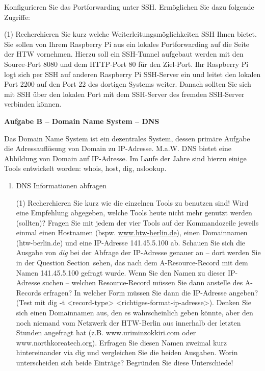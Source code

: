 \documentclass[paper=a4,fontsize=11pt]{scrartcl}%
\numberwithin{equation}{section}
\begin{document}
{\begin{enumerate}
	Konfigurieren Sie das Portforwarding unter SSH. Ermöglichen Sie dazu folgende Zugriffe:
	\begin{tasks}(1)
		\task Recherchieren Sie kurz welche Weiterleitungsmöglichkeiten SSH Ihnen bietet.
		\task Sie sollen von Ihrem Raspberry Pi aus ein lokales Portforwarding auf die Seite der HTW vornehmen. Hierzu soll ein SSH-Tunnel aufgebaut werden mit den Source-Port 8080 und dem HTTP-Port 80 für den Ziel-Port.
		\task Ihr Raspberry Pi logt sich per SSH auf anderen Raspberry Pi SSH-Server ein und leitet den lokalen Port 2200 auf den Port 22 des dortigen Systems weiter. Danach sollten Sie sich mit SSH über den lokalen Port mit dem SSH-Server des fremden SSH-Server verbinden können.
	\end{tasks}
\end{enumerate}
\begin{center}\Large{\textbf{Aufgabe B -- Domain Name System -- DNS}}\end{center}\vskip0.25in
Das Domain Name System ist ein dezentrales System, dessen primäre Aufgabe die Adressauflösung von Domain zu IP-Adresse. M.a.W. DNS bietet eine Abbildung von Domain auf IP-Adresse. Im Laufe der Jahre sind hierzu einige Tools entwickelt worden: whois, host, dig, nslookup.
\begin{enumerate}
	\item DNS Informationen abfragen
	\begin{tasks}(1)
		\task Recherchieren Sie kurz wie die einzelnen Tools zu benutzen sind! Wird eine Empfehlung abgegeben, welche Tools heute nicht mehr genutzt werden (sollten)?
		\task Fragen Sie mit jedem der vier Tools auf der Kommandozeile jeweils einmal einen Hostnamen (bspw. \url{www.htw-berlin.de}), einen Domainnamen (htw-berlin.de) und eine
IP-Adresse 141.45.5.100 ab.
		\task Schauen Sie sich die Ausgabe von \emph{dig} bei der Abfrage der IP-Adresse genauer an -- dort werden Sie in der \glqq Question Section\grqq\ sehen, das nach dem A-Resource-Record mit dem Namen 141.45.5.100 gefragt wurde. Wenn Sie den Namen zu dieser IP-Adresse suchen -- welchen Resource-Record müssen Sie dann anstelle des A-Records erfragen? 
		\task In welcher Form müssen Sie dann die IP-Adresse angeben? (Test mit dig -t <record-type> <richtiges-format-ip-adresse>).
		\task Denken Sie sich einen Domainnamen aus, den es wahrscheinlich geben könnte, aber den noch niemand vom Netzwerk der HTW-Berlin aus innerhalb der letzten Stunden angefragt hat (z.B. www.uriminzokkiri.com oder www.northkoreatech.org). Erfragen Sie diesen Namen zweimal kurz hintereinander via dig und vergleichen Sie die beiden Ausgaben. Worin unterscheiden sich beide Einträge? Begründen Sie diese Unterschiede!

\end{tasks}
\end{enumerate}}
\end{document}

